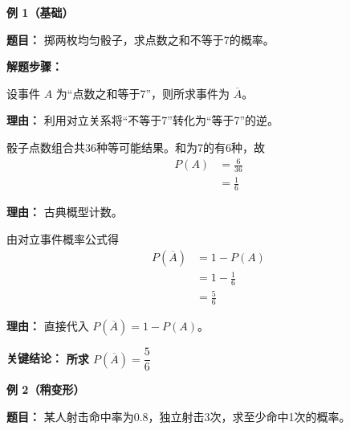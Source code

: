 \begin{examplebox}
	\textbf{\textcolor{CExample}{例 1（基础）}}

	\textbf{\textcolor{CExample}{题目：}}
	掷两枚均匀骰子，求点数之和不等于7的概率。

	\textbf{\textcolor{CExample}{解题步骤：}}
	\begin{description}[style=nextline, leftmargin=2.8em, labelsep=0.5em, itemsep=0.45em]
		\item[\textbf{第一步（找对立事件）：}] 设事件 $A$ 为“点数之和等于7”，则所求事件为 $\overline{A}$。
			\par\textbf{理由：} 利用对立关系将“不等于7”转化为“等于7”的逆。
		\item[\textbf{第二步（算反面概率）：}] 骰子点数组合共36种等可能结果。和为7的有6种，故
			\[
				\begin{aligned}
					P(A) &= \frac{6}{36} \\
					&= \frac{1}{6}
			\end{aligned}
			\]
			\par\textbf{理由：} 古典概型计数。
		\item[\textbf{第三步（代入公式）：}] 由对立事件概率公式得
			\[
				\begin{aligned}
					P(\overline{A}) &= 1 - P(A) \\
					&= 1 - \frac{1}{6} \\
					&= \frac{5}{6}
			\end{aligned}
			\]
			\par\textbf{理由：} 直接代入 $P(\overline{A})=1-P(A)$。
	\end{description}

	\textbf{\textcolor{CExample}{关键结论：}}
	\textbf{所求 $P(\overline{A})=\dfrac{5}{6}$}

	\medskip
	\textbf{\textcolor{CExample}{例 2（稍变形）}}

	\textbf{\textcolor{CExample}{题目：}}
	某人射击命中率为0.8，独立射击3次，求至少命中1次的概率。


\end{examplebox}
